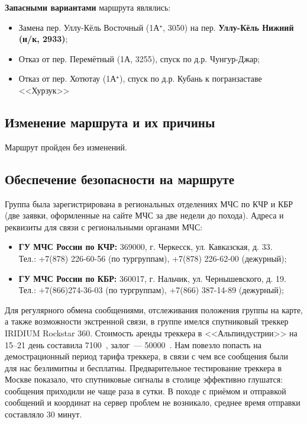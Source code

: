 \textbf{Запасными вариантами} маршрута являлись:
\begin{itemize}
	\item Замена пер. Уллу-Кёль Восточный (1А$^\star$, 3050) на пер. \textbf{Уллу-Кёль Нижний (н/к, 2933)};
	\item Отказ от пер. Перемётный (1А, 3255), спуск по д.р. Чунгур-Джар;
	\item Отказ от пер. Хотютау (1А$^\star$), спуск по д.р. Кубань к погранзаставе <<Хурзук>>
\end{itemize}

\subsection{Изменение маршрута и их причины}
Маршрут пройден без изменений.



\subsection{Обеспечение безопасности на маршруте}

Группа была зарегистрирована в региональных отделениях МЧС по КЧР и КБР (две заявки, оформленные на сайте МЧС за две недели до похода).
Адреса и реквизиты для связи с региональными органами МЧС:
\begin{itemize}
	\item \textbf{ГУ МЧС России по КЧР:} 369000, г. Черкесск, ул. Кавказская, д. 33.\\
	Тел.: +7(878) 226-60-56 (по тургруппам), +7(878) 226-62-00 (дежурный);
	
	\item \textbf{ГУ МЧС России по КБР:} 360017, г. Нальчик, ул. Чернышевского, д. 19.\\
	Тел.: +7(866)274-36-03 (по тургруппам), +7(866) 387-14-89 (дежурный);	
\end{itemize}

Для регулярного обмена сообщениями, отслеживания положения группы на карте, а также возможности экстренной связи, в группе имелся спутниковый треккер IRIDIUM Rockstar 360. Стоимость аренды треккера в <<Альпиндустрии>> на 15--21 день составила 7100~\faRub, залог~--- 50000~\faRub. Нам повезло попасть на демострационный период тарифа треккера, в связи с чем все сообщения были для нас безлимитны и бесплатны. Предварительное тестирование треккера в Москве показало, что спутниковые сигналы в столице эффективно глушатся: сообщения приходили не чаще раза в сутки. В походе с приёмом и отправкой сообщений и координат на сервер проблем не возникало, среднее время отправки составляло 30 минут.

